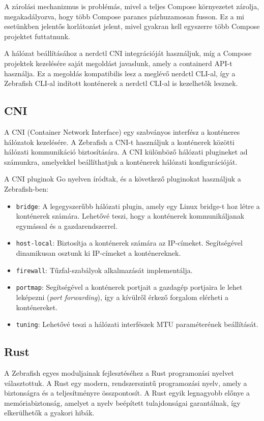 A zárolási mechanizmus is problémás, mivel a teljes Compose környezetet zárolja, megakadályozva, hogy több Compose parancs párhuzamosan fusson. Ez a mi esetünkben jelentős korlátozást jelent, mivel gyakran kell egyszerre több Compose projektet futtatnunk.

A hálózat beállításához a nerdctl CNI integrációját használjuk, míg a Compose projektek kezelésére saját megoldást javaslunk, amely a containerd API-t használja. Ez a megoldás kompatibilis lesz a meglévő nerdctl CLI-al, így a Zebrafish CLI-al indított konténerek a nerdctl CLI-al is kezelhetők lesznek.

\subsection{CNI}

A CNI (Container Network Interface) egy szabványos interfész a konténeres hálózatok kezelésére. A Zebrafish a CNI-t használjuk a konténerek közötti hálózati kommunikáció biztosítására. A CNI különböző hálózati plugineket ad számunkra, amelyekkel beállíthatjuk a konténerek hálózati konfigurációját.

A CNI pluginok Go nyelven íródtak, és a következő pluginokat használjuk a Zebrafish-ben:
\begin{itemize}
        \item \texttt{bridge}: A legegyszerűbb hálózati plugin, amely egy Linux bridge-t hoz létre a konténerek számára. Lehetővé teszi, hogy a konténerek kommunikáljanak egymással és a gazdarendszerrel.
        \item \texttt{host-local}: Biztosítja a konténerek számára az IP-címeket. Segítségével dinamikusan osztunk ki IP-címeket a konténereknek.
        \item \texttt{firewall}: Tűzfal-szabályok alkalmazását implementálja.
        \item \texttt{portmap}: Segítségével a konténerek portjait a gazdagép portjaira le lehet leképezni (\textit{port forwarding}), így a kívülről érkező forgalom elérheti a konténereket.
        \item \texttt{tuning}: Lehetővé teszi a hálózati interfészek MTU paraméterének beállítását.
\end{itemize}

\subsection{Rust}

A Zebrafish egyes moduljainak fejlesztéséhez a Rust programozási nyelvet választottuk. A Rust egy modern, rendszerszintű programozási nyelv, amely a biztonságra és a teljesítményre összpontosít. A Rust egyik legnagyobb előnye a memóriabiztonság, amelyet a nyelv beépített tulajdonságai garantálnak, így elkerülhetők a gyakori hibák.

